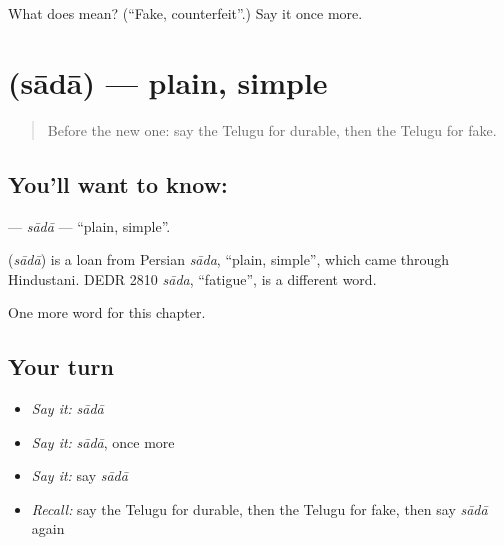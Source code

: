 \begin{tcolorbox}[breakable,colback=teal!4,colframe=teal!35!black,title={Before you move on}]
What does  mean? (\textquotedblleft{}Fake, counterfeit\textquotedblright{}.) Say it once more.
\end{tcolorbox}
\section[\texorpdfstring{\te{సాదా} (sādā)}{సాదా (sādā)}]{ (sādā) — plain, simple}

\label{lesson:TE-C182-sada}



\begin{quote}
Before the new one: say the Telugu for durable, then the Telugu for fake.
\end{quote}

\subsection*{You'll want to know: }
\textbf{} — \emph{sādā} — \textquotedblleft{}plain, simple\textquotedblright{}.

\begin{cousinweb}
\textbf{} (\emph{sādā}) is a loan from Persian \emph{sāda}, \textquotedblleft{}plain, simple\textquotedblright{}, which came through Hindustani. DEDR 2810 \emph{sāda}, \textquotedblleft{}fatigue\textquotedblright{}, is a different word.
\end{cousinweb}

\begin{grammarlens}[title={What you've built}]
One more word for this chapter.
\end{grammarlens}

\subsection*{Your turn}
\begin{itemize}
\raggedright
  \item \emph{Say it:} \emph{sādā}
  \item \emph{Say it:} \emph{sādā}, once more
  \item \emph{Say it:} say \emph{sādā}
  \item \emph{Recall:} say the Telugu for durable, then the Telugu for fake, then say \emph{sādā} again
\end{itemize}

